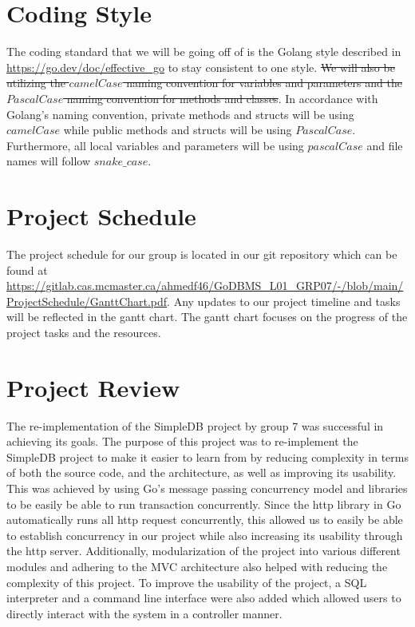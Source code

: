 \documentclass[12pt,letterpaper]{article}
\begin{document}
\section{Coding Style}

The coding standard that we will be going off of is the Golang style described in \url{https://go.dev/doc/effective_go} to stay consistent to one style. \sout{We will also be utilizing the $camelCase$ naming convention for variables and parameters and the $PascalCase$ naming convention for methods and classes}. {\color{red}In accordance with Golang's naming convention, private methods and structs will be using $camelCase$ while public methods and structs will be using $PascalCase$. Furthermore, all local variables and parameters will be using $pascalCase$ and file names will follow $snake\_case$.}

\section{Project Schedule}

The project schedule for our group is located in our git repository which can be found at \url{https://gitlab.cas.mcmaster.ca/ahmedf46/GoDBMS_L01_GRP07/-/blob/main/ProjectSchedule/GanttChart.pdf}. Any updates to our project timeline and tasks will be reflected in the gantt chart. The gantt chart focuses on the progress of the project tasks and the resources. 

\section{Project Review}

{\color{red} The re-implementation of the SimpleDB project by group 7 was successful in achieving its goals. The purpose of this project was to re-implement the SimpleDB project to make it easier to learn from by reducing complexity in terms of both the source code, and the architecture, as well as improving its usability. This was achieved by using Go's message passing concurrency model and libraries to be easily be able to run transaction concurrently. Since the http library in Go automatically runs all http request concurrently, this allowed us to easily be able to establish concurrency in our project while also increasing its usability through the http server. Additionally, modularization of the project into various different modules and adhering to the MVC architecture also helped with reducing the complexity of this project. To improve the usability of the project, a SQL interpreter and a command line interface were also added which allowed users to directly interact with the system in a controller manner.}\\
\end{document}
